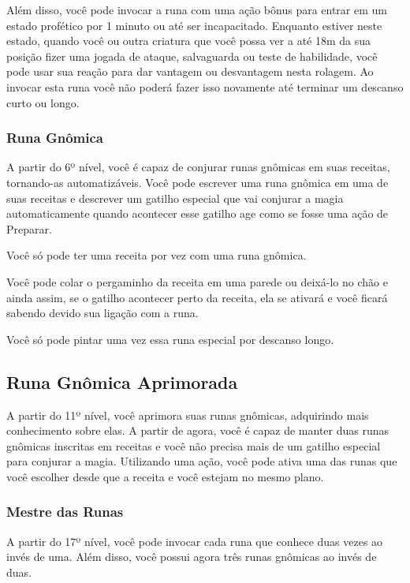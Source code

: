 \begin{multicols}{2}
Além disso, você pode invocar a runa com uma ação bônus para entrar em um estado
profético por 1 minuto ou até ser incapacitado. Enquanto estiver neste estado,
quando você ou outra criatura que você possa ver a até 18m da sua posição fizer
uma jogada de ataque, salvaguarda ou teste de habilidade, você pode usar sua
reação para dar vantagem ou desvantagem nesta rolagem. Ao invocar esta runa você
não poderá fazer isso novamente até terminar um descanso curto ou longo.

\subsubsection*{Runa Gnômica}%

A partir do 6º nível, você é capaz de conjurar runas gnômicas em suas receitas,
tornando-as automatizáveis. Você pode escrever uma runa gnômica em uma de suas
receitas e descrever um gatilho especial que vai conjurar a magia
automaticamente quando acontecer esse gatilho age como se fosse uma ação de
Preparar.

Você só pode ter uma receita por vez com uma runa gnômica.

Você pode colar o pergaminho da receita em uma parede ou deixá-lo no chão e
ainda assim, se o gatilho acontecer perto da receita, ela se ativará e você
ficará sabendo devido sua ligação com a runa.

Você só pode pintar uma vez essa runa especial por descanso longo.

\subsection*{Runa Gnômica Aprimorada}%

A partir do 11º nível, você aprimora suas runas gnômicas, adquirindo mais
conhecimento sobre elas. A partir de agora, você é capaz de manter duas runas
gnômicas inscritas em receitas e você não precisa mais de um gatilho especial
para conjurar a magia. Utilizando uma ação, você pode ativa uma das runas que
você escolher desde que a receita e você estejam no mesmo plano.

\subsubsection*{Mestre das Runas}%

A partir do 17º nível, você pode invocar cada runa que conhece duas vezes ao
invés de uma. Além disso, você possui agora três runas gnômicas ao invés de
duas.


\end{multicols}
